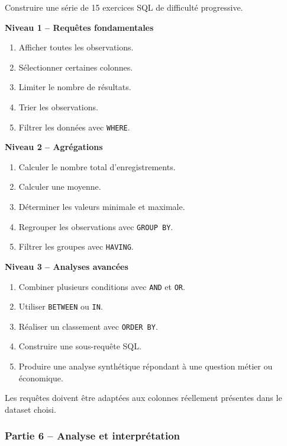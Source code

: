 \documentclass[
]{article}
\providecommand{\tightlist}{%
  \setlength{\itemsep}{0pt}\setlength{\parskip}{0pt}}
\begin{document}
Construire une série de 15 exercices SQL de difficulté progressive.

\textbf{Niveau 1 -- Requêtes fondamentales}

\begin{enumerate}
\def\labelenumi{\arabic{enumi}.}
\tightlist
\item
  Afficher toutes les observations.
\item
  Sélectionner certaines colonnes.
\item
  Limiter le nombre de résultats.
\item
  Trier les observations.
\item
  Filtrer les données avec \texttt{WHERE}.
\end{enumerate}

\textbf{Niveau 2 -- Agrégations}

\begin{enumerate}
\def\labelenumi{\arabic{enumi}.}
\setcounter{enumi}{5}
\tightlist
\item
  Calculer le nombre total d'enregistrements.
\item
  Calculer une moyenne.
\item
  Déterminer les valeurs minimale et maximale.
\item
  Regrouper les observations avec \texttt{GROUP\ BY}.
\item
  Filtrer les groupes avec \texttt{HAVING}.
\end{enumerate}

\textbf{Niveau 3 -- Analyses avancées}

\begin{enumerate}
\def\labelenumi{\arabic{enumi}.}
\setcounter{enumi}{10}
\tightlist
\item
  Combiner plusieurs conditions avec \texttt{AND} et \texttt{OR}.
\item
  Utiliser \texttt{BETWEEN} ou \texttt{IN}.
\item
  Réaliser un classement avec \texttt{ORDER\ BY}.
\item
  Construire une sous-requête SQL.
\item
  Produire une analyse synthétique répondant à une question métier ou
  économique.
\end{enumerate}

Les requêtes doivent être adaptées aux colonnes réellement présentes
dans le dataset choisi.

\subsubsection{Partie 6 -- Analyse et
interprétation}\label{partie-6-analyse-et-interpruxe9tation}
\end{document}
